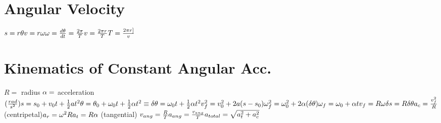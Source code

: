 \documentclass[11pt]{article}
\begin{document}
\begin{paracol}{3}
        \section*{Angular Velocity}
        \begin{fleqn}
            $
            s=r\theta \newline
            v=r\omega \newline
            \omega = \frac{d\theta}{dt} = \frac{2\pi}{T} \newline
            v = \frac{2\pi r}{T} \newline
            T = \frac{2\pi r]}{v} \newline
            $
        \end{fleqn}
        \section*{Kinematics of Constant Angular Acc.}
        \begin{fleqn}
            $
            R = $ radius $ \newline
            \alpha = $ acceleration $ (\frac{rad}{s^2}) \newline
            s=s_0 + v_0t + \frac{1}{2}at^2 \newline
            \theta = \theta_0 + \omega_0 t + \frac{1}{2}\alpha t^2 \equiv \delta \theta = \omega_0 t + \frac{1}{2}\alpha t^2 \newline
            v^2_f = v_0^2+2a(s-s_0)  \newline
            \omega^2_f = \omega_0 ^2 + 2 \alpha (\delta \theta) \newline
            \omega_f = \omega_0 + \alpha t  \newline
            v_f = R\omega \newline
            \delta s = R \delta \theta \newline
            a_c = \frac{v^2_f}{R} $ (centripetal)$\newline
            a_r = \omega^{2}R \newline
            a_t = R \alpha $ (tangential) $ \newline
            v_{ang} = \frac{R}{T} \newline
            a_{ang} = \frac{v_{ang}}{T} \newline
            a_{total} = \sqrt{a_t^2+a_c^2}
            $
        \end{fleqn}
        \switchcolumn

\end{paracol}
\end{document}
